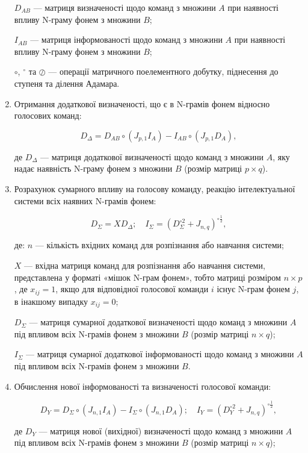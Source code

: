 \begin{enumerate}
{		$D_{AB}$ --- матриця визначеності щодо команд з множини $A$ при наявності впливу N-граму фонем з множини $B$; 
		
		$I_{AB}$ --- матриця інформованості щодо команд з множини $A$ при наявності впливу N-граму фонем з множини $B$;
		
		$\circ$, ${}^{\circ}$ та $\oslash$ --- операції матричного поелементного добутку, піднесення до ступеня та ділення Адамара.
		
	}
	
	\item Отримання додаткової визначеності, що є в N-грамів фонем відносно голосових команд:
	
	\[
	D_\Delta=D_{AB} \circ (J_{p,1}I_A)-I_{AB} \circ (J_{p,1}D_A),
	\]
	
	де $D_\Delta$ --- матриця додаткової визначеності щодо команд з множини $A$, яку надає наявність N-граму фонем з множини $B$ (розмір матриці $p\times q$).
	
	\item Розрахунок сумарного впливу на голосову команду, реакцію інтелектуальної системи всіх наявних N-грамів фонем:
	
	\[
	D_\Sigma = XD_\Delta;\quad I_\Sigma=(D_\Sigma^{\circ 2}+J_{n,q})^{\circ \frac{1}{2}},
	\]
	
	де: $n$ --- кількість вхідних команд для розпізнання або навчання системи; 
	
	{\settowidth{\leftskip}{де:\ }
		
		$X$ --- вхідна матриця команд для розпізнання або навчання системи, представлена у форматі «мішок N-грам фонем», тобто матриці розміром $n \times p$, де $x_{ij}=1$, якщо для відповідної голосової команди $i$ існує N-грам фонем $j$, в інакшому випадку $x_{ij}=0$;
	
		$D_\Sigma$ --- матриця сумарної додаткової визначеності щодо команд  з множини $A$ під впливом всіх N-грамів фонем з множини $B$ (розмір матриці $n\times q$);
		
		$I_\Sigma$ --- матриця сумарної додаткової інформованості щодо команд  з множини $A$ під впливом всіх N-грамів фонем з множини $B$.
		
	}
	
	\item Обчислення нової інформованості та визначеності голосової команди:
	
	\[
	D_Y=D_\Sigma \circ (J_{n,1}I_A) - I_\Sigma \circ (J_{n,1}D_A);\quad I_Y=(D_Y^{\circ 2}+J_{n,q})^{\circ \frac{1}{2}},
	\]
	
	де $D_Y$ --- матриця нової (вихідної) визначеності щодо команд  з множини $A$ під впливом всіх N-грамів фонем з множини $B$ (розмір матриці $n\times q$); 
	

\end{enumerate}
